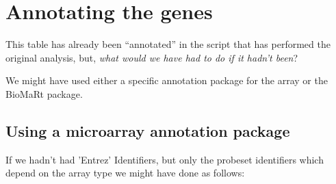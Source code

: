 \documentclass{article}\usepackage[]{graphicx}\usepackage[]{color}
\begin{document}
\section{Annotating the genes}

This table has already been ``annotated'' in the script that has
performed the original analysis, but, \emph{what would we have had to do if
it hadn't been}?

We might have used either a specific annotation package for the array
or the BioMaRt package.

\subsection{Using a microarray annotation package}

If we hadn't had 'Entrez' Identifiers, but only the probeset identifiers which depend on the array type we might have done as follows:
\end{document}
